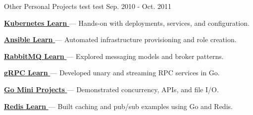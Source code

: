 \begin{cventries}
  \cventry
    {Other Personal Projects}
    {test}
    {test}
    {Sep. 2010 - Oct. 2011}
    {
      \begin{cvitems}
        \item {\href{https://github.com/nmdra/K8s-Learn}{\textbf{Kubernetes Learn} \faGithub} — Hands-on with deployments, services, and configuration.}
        \item {\href{https://github.com/nmdra/Ansible-Learn}{\textbf{Ansible Learn} \faGithub} — Automated infrastructure provisioning and role creation.}
        \item {\href{https://github.com/nmdra/RabbitMQ-Learn}{\textbf{RabbitMQ Learn} \faGithub} — Explored messaging models and broker patterns.}
        \item {\href{https://github.com/nmdra/gRPC-Learn}{\textbf{gRPC Learn} \faGithub} — Developed unary and streaming RPC services in Go.}
        \item {\href{https://github.com/nmdra/Go-Mini-Projects}{\textbf{Go Mini Projects} \faGithub} — Demonstrated concurrency, APIs, and file I/O.}
        \item {\href{https://github.com/nmdra/Redis-Learn}{\textbf{Redis Learn} \faGithub} — Built caching and pub/sub examples using Go and Redis.}
      \end{cvitems}
    }

\end{cventries}
